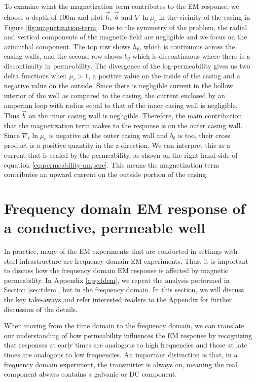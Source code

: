 \documentclass[onecolumn, extra, mreferee]{gji}
\begin{document}
To examine what the magnetization term contributes to the EM response, we choose a depth of 100m and plot $\vec{h}$, $\vec{b}$ and $\nabla \ln \mu_r$ in the vicinity of the casing in Figure \ref{fig:magnetization-term}. Due to the symmetry of the problem, the radial and vertical components of the magnetic field are negligible and we focus on the azimuthal component. The top row shows $h_\theta$, which is continuous across the casing walls, and the second row shows $b_\theta$ which is discontinuous where there is a discontinuity in permeability. The divergence of the log-permeability gives us two delta functions when $\mu_r > 1$, a positive value on the inside of the casing and a negative value on the outside. Since there is negligible current in the hollow interior of the well as compared to the casing, the current enclosed by an amperian loop with radius equal to that of the inner casing wall is negligible. Thus $\vec{b}$ on the inner casing wall is negligible. Therefore, the main contribution that the magnetization term makes to the response is on the outer casing wall. Since $\nabla_r \ln \mu_r$ is negative at the outer casing wall and $b_\theta$ is too, their cross product is a positive quantity in the z-direction. We can interpret this as a current that is scaled by the permeability, as shown on the right hand side of equation \ref{eq:permeability-ampere}. This means the magnetization term contributes an upward current on the outside portion of the casing.











\section{Frequency domain EM response of a conductive, permeable well}
\label{sec:fdem}

In practice, many of the EM experiments that are conducted in settings with steel infrastructure are frequency domain EM experiments. Thus, it is important to discuss how the frequency domain EM response is affected by magnetic permeability.
In Appendix \ref{app:fdem}, we repeat the analysis performed in Section \ref{sec:tdem}, but in the frequency domain. In this section, we will discuss the key take-aways and refer interested readers to the Appendix for further discussion of the details.

When moving from the time domain to the frequency domain, we can translate our understanding of how permeability influences the EM response by recognizing that responses at early times are analogous to high frequencies and those at late times are analogous to low frequencies. An important distinction is that, in a frequency domain experiment, the transmitter is always on, meaning the real component always contains a galvanic or DC component.
\end{document}
